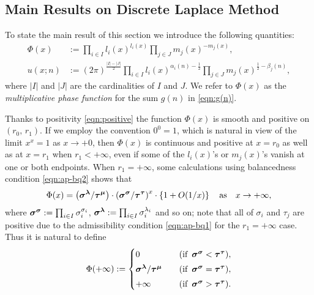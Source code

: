 \documentclass[a4paper,12pt]{article}
\theoremstyle{plain}
\def\sblambda{\mbox{\boldmath ${\scriptstyle \lambda}$}}
\def\sbmu{\mbox{\boldmath ${\scriptstyle \mu}$}}
\def\bsigma{\mbox{\boldmath $\sigma$}}
\def\sbsigma{\mbox{\boldmath ${\scriptstyle \sigma}$}}
\def\btau{\mbox{\boldmath $\tau$}}
\def\sbtau{\mbox{\boldmath ${\scriptstyle \tau}$}}
\begin{document}
\subsection{Main Results on Discrete Laplace Method} \label{subsec:results}
To state the main result of this section we introduce the following quantities: 
\begin{subequations} \label{eqn:G-asymp2}
\begin{align}
\Phi(x) &:= \prod_{i \in I} l_i(x)^{l_i(x)} \prod_{j \in J} m_j(x)^{-m_j(x)},  
\label{eqn:Phi} \\
u(x; n) &:= (2 \pi)^{\frac{|I|-|J|}{2}} 
\prod_{i \in I} l_i(x)^{\alpha_i(n) - \frac{1}{2} } 
\prod_{j \in J} m_j(x)^{ \frac{1}{2} - \beta_j(n)},  \label{eqn:u} 
\end{align}
\end{subequations}
where $|I|$ and $|J|$ are the cardinalities of $I$ and $J$.  
We refer to $\Phi(x)$ as the {\sl multiplicative phase function} for the 
sum $g(n)$ in \eqref{eqn:g(n)}. 
\par
Thanks to positivity \eqref{eqn:positive} the function $\Phi(x)$ is smooth  
and positive on $(r_0, \, r_1)$. 
If we employ the convention $0^0 = 1$, which is natural in view of    
the limit $x^x = 1$ as $x \to +0$, then $\Phi(x)$ is continuous and positive 
at $x = r_0$ as well as at $x = r_1$ when $r_1 < +\infty$, even if some of the 
$l_i(x)$'s or $m_j(x)$'s vanish at one or both endpoints. 
When $r_1 = + \infty$, some calculations using balancedness condition 
\eqref{eqn:ap-bq2} shows that   
\[
\Phi(x) = \left( \bsigma^{\sblambda} / \btau^{\sbmu} \right) \cdot 
\left( \bsigma^{\sbsigma} / \btau^{\sbtau} \right)^x \cdot 
\left \{ 1 + O(1/x) \right\} \quad \mbox{as} \quad x \to + \infty, 
\]
where $\bsigma^{\sbsigma} := \prod_{i \in I} \sigma_i^{\sigma_i}$, 
$\bsigma^{\sblambda} := \prod_{i \in I} \sigma_i^{\lambda_i}$ and 
so on; note that all of $\sigma_i$ and $\tau_j$ are positive due to the 
admissibility condition \eqref{eqn:ap-bq1} for the $r_1 = + \infty$ case. 
Thus it is natural to define  
\begin{equation} \label{eqn:Phi(inf)}
\Phi(+ \infty) := 
\begin{cases}
0 \quad & (\mbox{if} \,\,\, \bsigma^{\sbsigma} < \btau^{\sbtau} ), \\[1mm]
\bsigma^{\sblambda} / \btau^{\sbmu} \quad & 
(\mbox{if} \,\,\,  \bsigma^{\sbsigma} = \btau^{\sbtau} ),  \\[1mm]
+\infty \quad & (\mbox{if} \,\,\, \bsigma^{\sbsigma} > \btau^{\sbtau} ).  
\end{cases}
\end{equation}
\end{document}
